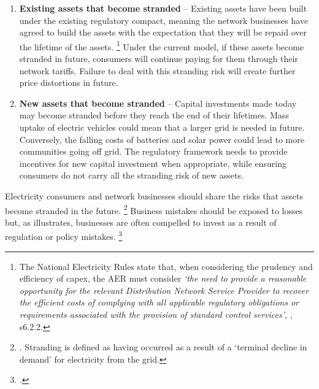 \documentclass[FrontPage]{grattan}
\begin{document}
\begin{enumerate}
 \item \textbf{Existing assets that become stranded} -- Existing assets have been built under the existing regulatory compact, meaning the network businesses have agreed to build the assets with the expectation that they will be repaid over the lifetime of the assets.%
 \footnote{The National Electricity Rules state that, when considering the prudency and efficiency of capex, the AER must consider \emph{`the need to provide a reasonable opportunity for the relevant Distribution Network Service Provider to recover the efficient costs of complying with all applicable regulatory obligations or requirements associated with the provision of standard control services'}, \textcite{AEMC2018NationalElectricityRules}, s6.2.2.} Under the current model, if these assets become stranded in future, consumers will continue paying for them through their network tariffs. Failure to deal with this stranding risk will create further price distortions in future. 
 \item \textbf{New assets that become stranded} -- Capital investments made today may become stranded before they reach the end of their lifetimes. Mass uptake of electric vehicles could mean that a larger grid is needed in future. Conversely, the falling costs of batteries and solar power could lead to more communities going off grid. The regulatory framework needs to provide incentives for new capital investment when appropriate, while ensuring consumers do not carry all the stranding risk of new assets.
\end{enumerate}


Electricity consumers and network businesses should share the risks that assets become stranded in the future.%
\footnote{\textcite{simshauser2017monopoly}. Stranding is defined as having occurred as a result of a `terminal decline in demand' for electricity from the grid.} 
Business mistakes should be exposed to losses but, as  illustrates, businesses are often compelled to invest as a result of regulation or policy mistakes.%
\footcite{simshauser2017monopoly}
\end{document}
